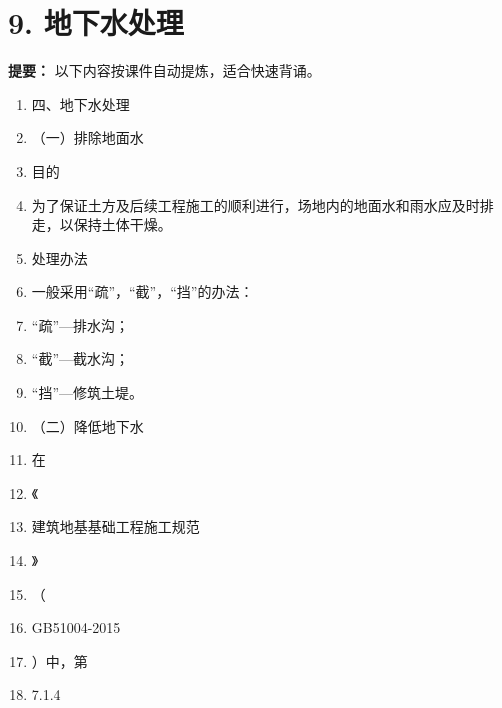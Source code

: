 \documentclass[UTF8,fontset=fandol,11pt]{ctexart}
\begin{document}
\newpage

\section*{9. 地下水处理}


\begin{mainbox}

\textbf{提要：} 以下内容按课件自动提炼，适合快速背诵。

\end{mainbox}

\begin{enumerate}[label=\arabic*.]

\item 四、地下水处理

\item （一）排除地面水

\item 目的

\item 为了保证土方及后续工程施工的顺利进行，场地内的地面水和雨水应及时排走，以保持土体干燥。

\item 处理办法

\item 一般采用“疏”，“截”，“挡”的办法：

\item “疏”—排水沟；

\item “截”—截水沟；

\item “挡”—修筑土堤。

\item （二）降低地下水

\item 在

\item 《

\item 建筑地基基础工程施工规范

\item 》

\item （

\item GB51004-2015

\item ）中，第

\item 7.1.4


\end{enumerate}
\end{document}
